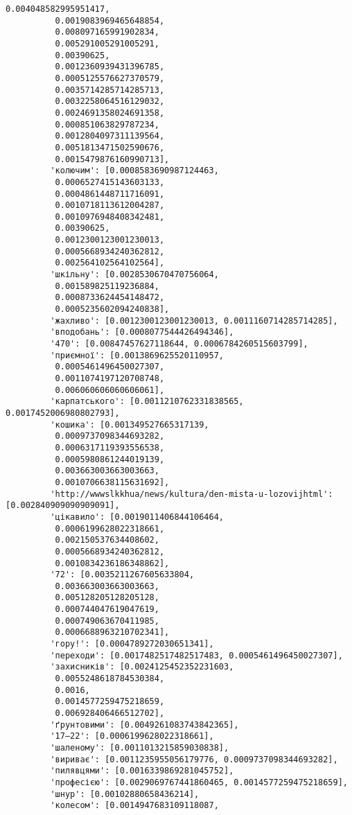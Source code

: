 \documentclass[11pt]{article}
\begin{document}
\begin{Verbatim}[commandchars=\\\{\}]
          0.004048582995951417,
          0.0019083969465648854,
          0.008097165991902834,
          0.005291005291005291,
          0.00390625,
          0.0012360939431396785,
          0.0005125576627370579,
          0.0035714285714285713,
          0.0032258064516129032,
          0.0024691358024691358,
          0.000851063829787234,
          0.0012804097311139564,
          0.0051813471502590676,
          0.0015479876160990713],
         'колючим': [0.0008583690987124463,
          0.0006527415143603133,
          0.0004861448711716091,
          0.0010718113612004287,
          0.0010976948408342481,
          0.00390625,
          0.0012300123001230013,
          0.0005668934240362812,
          0.002564102564102564],
         'шкільну': [0.0028530670470756064,
          0.001589825119236884,
          0.0008733624454148472,
          0.0005235602094240838],
         'жахливо': [0.0012300123001230013, 0.0011160714285714285],
         'вподобань': [0.0008077544426494346],
         '470': [0.00847457627118644, 0.0006784260515603799],
         'приємної': [0.0013869625520110957,
          0.0005461496450027307,
          0.0011074197120708748,
          0.006060606060606061],
         'карпатського': [0.0011210762331838565, 0.0017452006980802793],
         'кошика': [0.001349527665317139,
          0.0009737098344693282,
          0.0006317119393556538,
          0.0005980861244019139,
          0.003663003663003663,
          0.0010706638115631692],
         'http://wwwslkkhua/news/kultura/den-mista-u-lozovijhtml': [0.002840909090909091],
         'цікавило': [0.0019011406844106464,
          0.0006199628022318661,
          0.002150537634408602,
          0.0005668934240362812,
          0.0010834236186348862],
         '72': [0.0035211267605633804,
          0.003663003663003663,
          0.005128205128205128,
          0.000744047619047619,
          0.000749063670411985,
          0.0006688963210702341],
         'гору!': [0.0004789272030651341],
         'переходи': [0.0017482517482517483, 0.0005461496450027307],
         'захисників': [0.0024125452352231603,
          0.0055248618784530384,
          0.0016,
          0.0014577259475218659,
          0.006928406466512702],
         'ґрунтовими': [0.0049261083743842365],
         '17–22': [0.0006199628022318661],
         'шаленому': [0.0011013215859030838],
         'вириває': [0.0011235955056179776, 0.0009737098344693282],
         'пилявцями': [0.0016339869281045752],
         'професією': [0.0029069767441860465, 0.0014577259475218659],
         'шнур': [0.00102880658436214],
         'колесом': [0.0014947683109118087,

\end{Verbatim}
\end{document}
